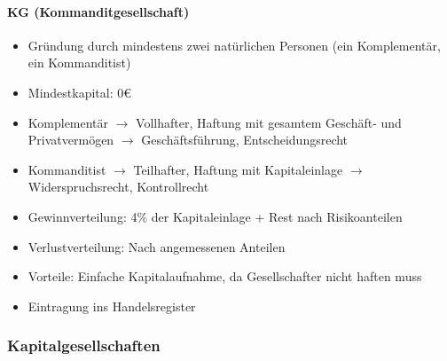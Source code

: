 \documentclass[titlepage,parskip=half]{scrartcl}
\begin{document}
\paragraph{KG (Kommanditgesellschaft)}
\begin{itemize}
    \item Gründung durch mindestens zwei natürlichen Personen (ein Komplementär, ein Kommanditist) 
    \item Mindestkapital: 0€
    \item Komplementär $\rightarrow$ Vollhafter, Haftung mit gesamtem Geschäft- und Privatvermögen $\rightarrow$ Geschäftsführung, Entscheidungsrecht
    \item Kommanditist $\rightarrow$ Teilhafter, Haftung mit Kapitaleinlage $\rightarrow$ Widerspruchsrecht, Kontrollrecht
    \item Gewinnverteilung: 4\% der Kapitaleinlage + Rest nach Risikoanteilen
    \item Verlustverteilung: Nach angemessenen Anteilen
    \item Vorteile: Einfache Kapitalaufnahme, da Gesellschafter nicht haften muss
    \item Eintragung ins Handelsregister
\end{itemize}

\subsubsection{Kapitalgesellschaften}
\end{document}
